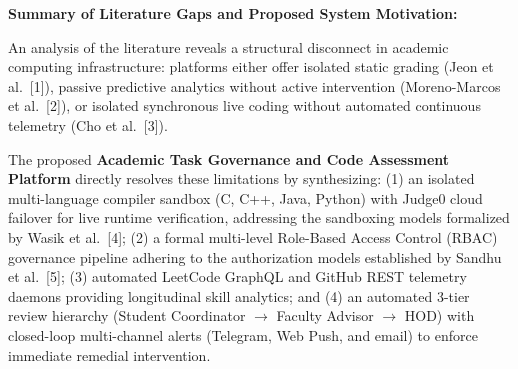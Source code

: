 {\vspace{0.25cm}
\textbf{Summary of Literature Gaps and Proposed System Motivation:}\par
An analysis of the literature reveals a structural disconnect in academic computing infrastructure: platforms either offer isolated static grading (Jeon et al.~[1]), passive predictive analytics without active intervention (Moreno-Marcos et al.~[2]), or isolated synchronous live coding without automated continuous telemetry (Cho et al.~[3]). 

The proposed \textbf{Academic Task Governance and Code Assessment Platform} directly resolves these limitations by synthesizing: (1) an isolated multi-language compiler sandbox (C, C++, Java, Python) with Judge0 cloud failover for live runtime verification, addressing the sandboxing models formalized by Wasik et al.~[4]; (2) a formal multi-level Role-Based Access Control (RBAC) governance pipeline adhering to the authorization models established by Sandhu et al.~[5]; (3) automated LeetCode GraphQL and GitHub REST telemetry daemons providing longitudinal skill analytics; and (4) an automated 3-tier review hierarchy (Student Coordinator $\rightarrow$ Faculty Advisor $\rightarrow$ HOD) with closed-loop multi-channel alerts (Telegram, Web Push, and email) to enforce immediate remedial intervention.\par}
\newpage
